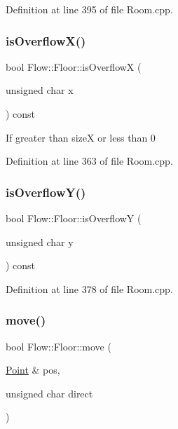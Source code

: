 Definition at line 395 of file Room.\+cpp.

\hypertarget{class_flow_1_1_floor_a6511d441ffd99d0a0d85669cfa846945}{}\label{class_flow_1_1_floor_a6511d441ffd99d0a0d85669cfa846945} 
\subsubsection{\texorpdfstring{is\+Overflow\+X()}{isOverflowX()}}
{\footnotesize\ttfamily bool Flow\+::\+Floor\+::is\+OverflowX (\begin{DoxyParamCaption}\item[{unsigned char}]{x }\end{DoxyParamCaption}) const}

If greater than sizeX or less than 0 

Definition at line 363 of file Room.\+cpp.

\hypertarget{class_flow_1_1_floor_aae39e73db09b3b26d17dfda7418a67d1}{}\label{class_flow_1_1_floor_aae39e73db09b3b26d17dfda7418a67d1} 
\subsubsection{\texorpdfstring{is\+Overflow\+Y()}{isOverflowY()}}
{\footnotesize\ttfamily bool Flow\+::\+Floor\+::is\+OverflowY (\begin{DoxyParamCaption}\item[{unsigned char}]{y }\end{DoxyParamCaption}) const}



Definition at line 378 of file Room.\+cpp.

\hypertarget{class_flow_1_1_floor_a257b06bf103cca41a2b6e42692fb4fbe}{}\label{class_flow_1_1_floor_a257b06bf103cca41a2b6e42692fb4fbe} 
\subsubsection{\texorpdfstring{move()}{move()}}
{\footnotesize\ttfamily bool Flow\+::\+Floor\+::move (\begin{DoxyParamCaption}\item[{\hyperlink{struct_flow_1_1_point}{Point} \&}]{pos,  }\item[{unsigned char}]{direct }\end{DoxyParamCaption})}



